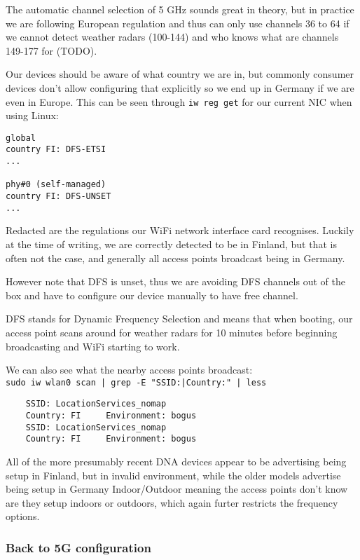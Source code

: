 \documentclass[../wifi-security.tex]{subfiles}
\begin{document}
The automatic channel selection of 5 GHz sounds great in theory, but in practice we are following European regulation and thus can only use channels 36 to 64 if we cannot detect weather radars (100-144) \autocite{metisdfs} and who knows what are channels 149-177 for (TODO).

Our devices should be aware of what country we are in, but commonly consumer devices don't allow configuring that explicitly so we end up in Germany if we are even in Europe. This can be seen through \texttt{iw reg get} for our current NIC when using Linux:

\begin{verbatim}
global
country FI: DFS-ETSI
...

phy#0 (self-managed)
country FI: DFS-UNSET
...
\end{verbatim}

Redacted are the regulations our WiFi network interface card recognises. Luckily at the time of writing, we are correctly detected to be in Finland, but that is often not the case, and generally all access points broadcast being in Germany.

However note that DFS is unset, thus we are avoiding DFS channels out of the box and have to configure our device manually to have free channel.

DFS stands for Dynamic Frequency Selection and means that when booting, our access point scans around for weather radars for 10 minutes before beginning broadcasting and WiFi starting to work.

We can also see what the nearby access points broadcast:\\ \texttt{sudo iw wlan0 scan | grep -E "SSID:|Country:" | less}

\begin{verbatim}
	SSID: LocationServices_nomap
	Country: FI     Environment: bogus
	SSID: LocationServices_nomap
	Country: FI     Environment: bogus
\end{verbatim}

All of the more presumably recent DNA devices appear to be advertising being setup in Finland, but in invalid environment, while the older models advertise being setup in Germany Indoor/Outdoor meaning the access points don't know are they setup indoors or outdoors, which again furter restricts the frequency options.

\subsubsection{Back to 5G configuration}
\end{document}
